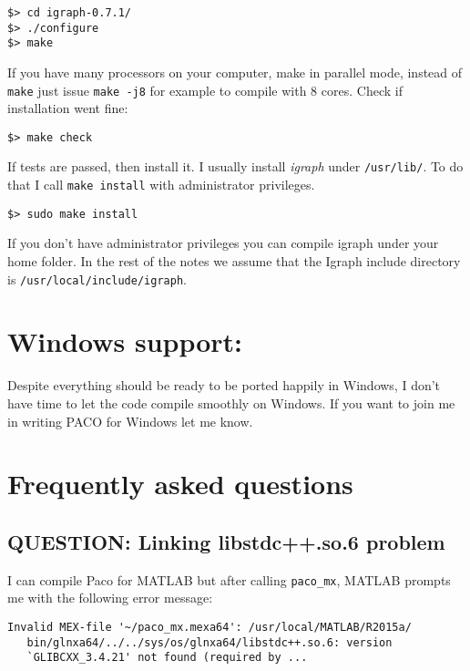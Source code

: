 \documentclass[11pt,%
              a4paper,%
]{article}
\begin{document}
\begin{verbatim}
$> cd igraph-0.7.1/
$> ./configure
$> make 
\end{verbatim}
If you have many processors on your computer, make in parallel mode,  instead of \texttt{make} just issue \texttt{make\ -j8} for example to   compile with 8 cores.
Check if installation went fine:

\begin{verbatim}
$> make check
\end{verbatim}

If tests are passed, then install it. I usually install \emph{igraph}  under \texttt{/usr/lib/}. To do that I call \texttt{make\ install} with administrator privileges.

\begin{verbatim}
$> sudo make install
\end{verbatim}
If you don't have administrator privileges you can compile igraph under your home folder.
In the rest of the notes we assume that the Igraph include directory is
\texttt{/usr/local/include/igraph}.

\section{Windows support:}\label{windows-support}

Despite everything should be ready to be ported happily in Windows, I
don't have time to let the code compile smoothly on Windows. If you want
to join me in writing PACO for Windows let me know.

\section{Frequently asked questions}

\subsection{QUESTION: Linking libstdc++.so.6
problem}\label{linking-libstdc.so.6-problem}

I can compile Paco for MATLAB but after calling \texttt{paco\_mx},
MATLAB prompts me with the following error message:

\begin{verbatim}
Invalid MEX-file '~/paco_mx.mexa64': /usr/local/MATLAB/R2015a/
   bin/glnxa64/../../sys/os/glnxa64/libstdc++.so.6: version
   `GLIBCXX_3.4.21' not found (required by ...
\end{verbatim}
\end{document}
